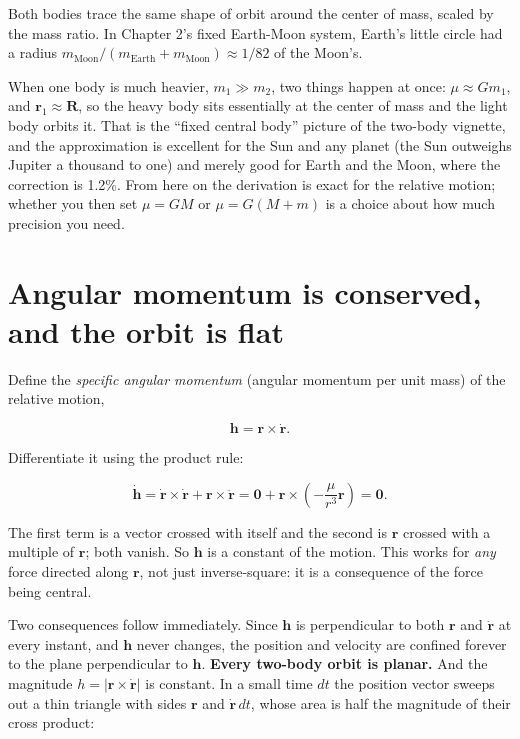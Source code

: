 \documentclass[
  10.5pt,
  letterpaper,
]{scrbook}
\theoremstyle{definition}
\theoremstyle{plain}
\theoremstyle{remark}
\begin{document}
Both bodies trace the same shape of orbit around the center of mass,
scaled by the mass ratio. In Chapter 2's fixed Earth-Moon system,
Earth's little circle had a radius
\(m_{\mathrm{Moon}}/(m_{\mathrm{Earth}}+m_{\mathrm{Moon}}) \approx 1/82\)
of the Moon's.

When one body is much heavier, \(m_1 \gg m_2\), two things happen at
once: \(\mu \approx G m_1\), and \(\mathbf{r}_1 \approx \mathbf{R}\), so
the heavy body sits essentially at the center of mass and the light body
orbits it. That is the ``fixed central body'' picture of the two-body
vignette, and the approximation is excellent for the Sun and any planet
(the Sun outweighs Jupiter a thousand to one) and merely good for Earth
and the Moon, where the correction is 1.2\%. From here on the derivation
is exact for the relative motion; whether you then set \(\mu = GM\) or
\(\mu = G(M+m)\) is a choice about how much precision you need.

\section{Angular momentum is conserved, and the orbit is
flat}\label{angular-momentum-is-conserved-and-the-orbit-is-flat}

Define the \emph{specific angular momentum} (angular momentum per unit
mass) of the relative motion,

\[
\mathbf{h} = \mathbf{r} \times \dot{\mathbf{r}}.
\]

Differentiate it using the product rule:

\[
\dot{\mathbf{h}} = \dot{\mathbf{r}} \times \dot{\mathbf{r}} + \mathbf{r} \times \ddot{\mathbf{r}}
= \mathbf{0} + \mathbf{r} \times \left(-\frac{\mu}{r^3}\mathbf{r}\right) = \mathbf{0}.
\]

The first term is a vector crossed with itself and the second is
\(\mathbf{r}\) crossed with a multiple of \(\mathbf{r}\); both vanish.
So \(\mathbf{h}\) is a constant of the motion. This works for \emph{any}
force directed along \(\mathbf{r}\), not just inverse-square: it is a
consequence of the force being central.

Two consequences follow immediately. Since \(\mathbf{h}\) is
perpendicular to both \(\mathbf{r}\) and \(\dot{\mathbf{r}}\) at every
instant, and \(\mathbf{h}\) never changes, the position and velocity are
confined forever to the plane perpendicular to \(\mathbf{h}\).
\textbf{Every two-body orbit is planar.} And the magnitude
\(h = |\mathbf{r}\times\dot{\mathbf{r}}|\) is constant. In a small time
\(dt\) the position vector sweeps out a thin triangle with sides
\(\mathbf{r}\) and \(\dot{\mathbf{r}}\,dt\), whose area is half the
magnitude of their cross product:
\end{document}
